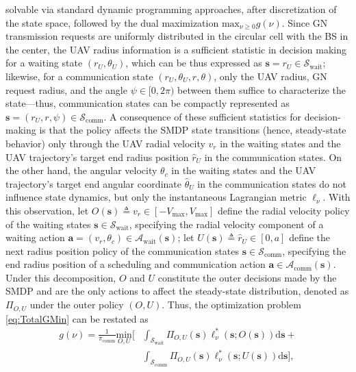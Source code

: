 \documentclass[10pt,twocolumn]{IEEEtran}
\begin{document}
solvable via standard dynamic programming approaches, after discretization of the state space, followed by the dual maximization $\mathrm{max}_{\nu{\geq}0}g(\nu)$. Since GN transmission requests are uniformly distributed in the circular cell with the BS in the center, the UAV radius information is a sufficient statistic in decision making for a waiting state $(r_{U},\theta_{U})$, which can be thus expressed as $\mathbf{s}{=}r_{U}{\in}\mathcal{S}_{\mathrm{wait}}$; likewise, for a communication state $(r_{U},\theta_{U},r,\theta)$, only the UAV radius, GN request radius, and the angle $\psi{\in}[0,2\pi)$ between them suffice to characterize the state---thus, communication states can be compactly represented as $\mathbf{s}{=}(r_{U},r,\psi){\in}\mathcal{S}_{\mathrm{comm}}$. A consequence of these sufficient statistics for decision-making is that the policy affects the SMDP state transitions (hence, steady-state behavior) only through the UAV radial velocity $v_{r}$ in the waiting states and the UAV trajectory's target end radius position $\hat{r}_{U}$ in the communication states. On the other hand, the angular velocity $\theta_{c}$ in the waiting states and the UAV trajectory's target end angular coordinate $\hat{\theta}_{U}$ in the communication states do not influence state dynamics, but only the instantaneous Lagrangian metric $\ell_{\nu}$. With this observation, let $O(\mathbf{s}){\triangleq}v_{r}{\in}[-V_{\mathrm{max}},V_{\mathrm{max}}]$ define the radial velocity policy of the waiting states $\mathbf{s}{\in}\mathcal{S}_{\mathrm{wait}}$, specifying the radial velocity component of a waiting action $\mathbf{a}{=}(v_{r},\theta_{c}) \in \mathcal{A}_{\mathrm{wait}}(\mathbf{s})$; let $U(\mathbf{s}){\triangleq}\hat{r}_{U}{\in}[0,a]$ define the next radius position policy of the communication states $\mathbf{s}{\in}\mathcal{S}_{\mathrm{comm}}$, specifying the end radius position of a scheduling and communication action $\mathbf{a}{\in}\mathcal{A}_{\mathrm{comm}}(\mathbf{s})$. Under this decomposition, $O$ and $U$ constitute the outer decisions made by the SMDP and are the only actions to affect the steady-state distribution, denoted as $\Pi_{O,U}$ under the outer policy $(O,U)$. Thus, the optimization problem \eqref{eq:TotalGMin} can be restated as
\begin{align}\label{eq:PolDecomp}
	g(\nu) = \frac{1}{\pi_{\mathrm{comm}}} \underset{O,U}{\mathrm{min}} \Bigr[ &\int_{\mathcal{S}_{\mathrm{wait}}} \Pi_{O,U}(\mathbf{s}) \ell_{\nu}^{*}(\mathbf{s}; O(\mathbf{s}))\mathrm{d}\mathbf{s} +\nonumber\\&\int_{\mathcal{S}_{\mathrm{comm}}} \Pi_{O,U}(\mathbf{s}) \ell_{\nu}^{*}(\mathbf{s}; U(\mathbf{s})) \mathrm{d}\mathbf{s} \Bigr],
\end{align}
\end{document}

